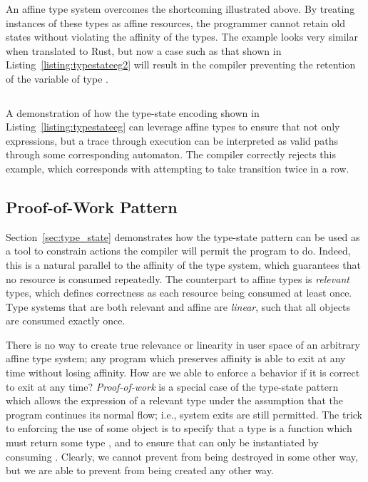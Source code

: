An affine type system overcomes the shortcoming illustrated above. By treating instances of these types as affine resources, the programmer cannot retain old states without violating the affinity of the types. The example looks very similar when translated to Rust, but now a case such as that shown in Listing~\ref{listing:typestateeg2} will result in the compiler preventing the retention of the variable of type .

\begin{listing}[ht]
	\inputminted[]{rust}{typestate_eg2.rs}
	\caption[Type state automaton in Rust with execution traces as runs.]{A demonstration of how the type-state encoding shown in Listing~\ref{listing:typestateeg} can leverage affine types to ensure that not only expressions, but a trace through execution can be interpreted as valid paths through some corresponding automaton. The compiler correctly rejects this example, which corresponds with attempting to take transition  twice in a row.}
	\label{listing:typestateeg2}
\end{listing}

\subsection{Proof-of-Work Pattern}
\label{sec:proof_of_work}
Section~\ref{sec:type_state} demonstrates how the type-state pattern can be used as a tool to constrain actions the compiler will permit the program to do. Indeed, this is a natural parallel to the affinity of the type system, which guarantees that no resource is consumed repeatedly. The counterpart to affine types is \textit{relevant} types, which defines correctness as each resource being consumed at least once. Type systems that are both relevant and affine are \textit{linear}, such that all objects are consumed exactly once.

There is no way to create true relevance or linearity in user space of an arbitrary affine type system; any program which preserves affinity is able to exit at any time without losing affinity. How are we able to enforce a behavior if it is correct to exit at any time? \textit{Proof-of-work} is a special case of the type-state pattern which allows the expression of a relevant type under the assumption that the program continues its normal flow; i.e., system exits are still permitted. The trick to enforcing the use of some object  is to specify that a type is a function which must return some type , and to ensure that  can only be instantiated by consuming . Clearly, we cannot prevent  from being destroyed in some other way, but we are able to prevent  from being created any other way.

